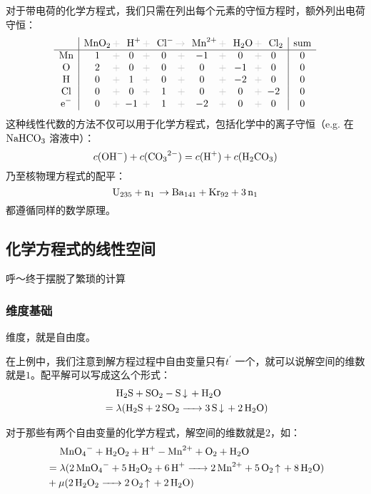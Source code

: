 \documentclass{ctexart}
\newcommand{\grayplus}{\,\color{lightgray}+\,}
\newcommand{\grayto}{\,\color{lightgray}\to\,}
\begin{document}
对于带电荷的化学方程式，我们只需在列出每个元素的守恒方程时，额外列出电荷守恒：
\[
    \begin{array}{c|*{5}{c@{\grayplus}}c|c}
        & \multicolumn{1}{c@{\grayplus}}{\ce{MnO2}} &
        \multicolumn{1}{c@{\grayplus}}{\ce{H+}} &
        \multicolumn{1}{c@{\grayto}}{\ce{Cl-}} &
        \multicolumn{1}{c@{\grayplus}}{\ce{Mn^2+}} &
        \multicolumn{1}{c@{\grayplus}}{\ce{H2O}} &
        \multicolumn{1}{c|}{\ce{Cl2}} & \text{sum} \\
        \hline
        \ce{Mn} & 1 & 0 & 0 & -1 & 0 & 0 & 0\\
        \ce{O} & 2 & 0 & 0 & 0 & -1 & 0 & 0\\
        \ce{H} & 0 & 1 & 0 & 0 & -2 & 0 & 0\\
        \ce{Cl} & 0 & 0 & 1 & 0 & 0 & -2 & 0\\
        \ce{e^-} & 0 & -1 & 1 & -2 & 0 & 0 & 0\\
    \end{array}
\]
这种线性代数的方法不仅可以用于化学方程式，包括化学中的离子守恒（e.g. 在\(\ce{NaHCO3}\) 溶液中）：
\[
    c(\ce{OH^-}) + c(\ce{CO3^{2-}}) = c(\ce{H^+}) + c(\ce{H2CO3})
\]
乃至核物理方程式的配平：\[
    \ce{U235 + n1 \to Ba141 + Kr92 + 3n1}
\]
都遵循同样的数学原理。

\subsection{化学方程式的线性空间}

呼～终于摆脱了繁琐的计算

\subsubsection{维度基础}

维度，就是自由度。

在上例中，我们注意到解方程过程中自由变量只有\(t^{\prime}\) 一个，就可以说解空间的维数就是\(1\)。配平解可以写成这么个形式：
\begin{align*}
    &\placeholder{=}\ce{H2S +  SO2 -  S v + H2O}\\
    &= \lambda (\ce{H2S + 2 SO2 -> 3 S v + 2 H2O})
\end{align*}

对于那些有两个自由变量的化学方程式，解空间的维数就是\(2\)，如：
\begin{align*}
    &\placeholder{=}\ce{MnO4^- + H2O2 + H^+ - Mn^2+ + O2 + H2O} \\
    &=\lambda(\ce{2 MnO4^- + 5 H2O2 + 6 H^+ -> 2 Mn^2+ + 5 O2 ^ + 8 H2O}) \\
    &+\mu(\ce{2 H2O2 -> 2 O2 ^ + 2 H2O})
\end{align*}
\end{document}
